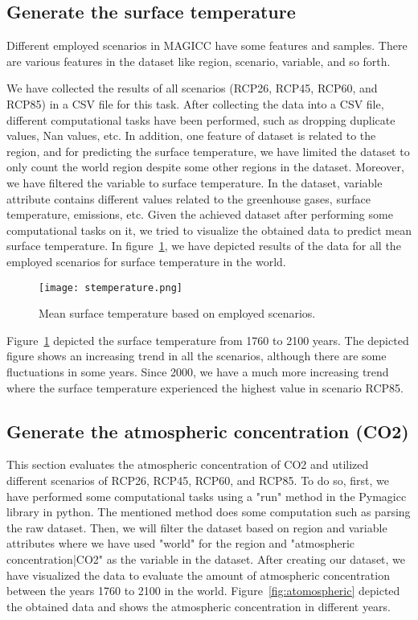 \documentclass[12pt]{article}
\begin{document}
\subsection{Generate the surface temperature}
\label{lab:stemp}
Different employed scenarios in MAGICC have some features and samples. There are various features in the dataset like region, scenario, variable, and so forth.

We have collected the results of all scenarios (RCP26, RCP45, RCP60, and RCP85) in a CSV file for this task. After collecting the data into a CSV file, different computational tasks have been performed, such as dropping duplicate values, Nan values, etc. In addition, one feature of dataset is related to the region, and for predicting the surface temperature, we have limited the dataset to only count the world region despite some other regions in the dataset. Moreover, we have filtered the variable to surface temperature. In the dataset, variable attribute contains different values related to the greenhouse gases, surface temperature, emissions, etc. Given the achieved dataset after performing some computational tasks on it, we tried to visualize the obtained data to predict mean surface temperature. In figure~\ref{fig:stemperature}, we have depicted results of the data for all the employed scenarios for surface temperature in the world.




\begin{figure}[H]
\centering
\texttt{[image: stemperature.png]}
\caption{Mean surface temperature based on employed scenarios.}
\label{fig:stemperature}
\end{figure}

Figure~\ref{fig:stemperature} depicted the surface temperature from 1760 to 2100 years. The depicted figure shows an increasing trend in all the scenarios, although there are some fluctuations in some years. Since 2000, we have a much more increasing trend where the surface temperature experienced the highest value in scenario RCP85.



\subsection{Generate the atmospheric concentration (CO2)}
\label{lab:stemp}

This section evaluates the atmospheric concentration of CO2 and utilized different scenarios of RCP26, RCP45, RCP60, and RCP85. To do so, first, we have performed some computational tasks using a "run" method in the Pymagicc library in python. The mentioned method does some computation such as parsing the raw dataset. Then, we will filter the dataset based on region and variable attributes where we have used "world" for the region and "atmospheric concentration|CO2" as the variable in the dataset. After creating our dataset, we have visualized the data to evaluate the amount of atmospheric concentration between the years 1760 to 2100 in the world. Figure~\ref{fig:atomospheric} depicted the obtained data and shows the atmospheric concentration in different years.
\end{document}
